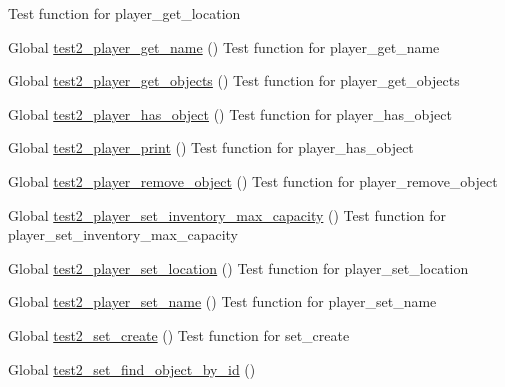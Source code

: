 \begin{DoxyRefList}
%
Test function for player\+\_\+get\+\_\+location  
\item[Global \mbox{\hyperlink{player__test_8c_a3aa908fd360b74e7786422260e8e16a0}{test2\+\_\+player\+\_\+get\+\_\+name}} ()]\label{test__test000132}%
%
Test function for player\+\_\+get\+\_\+name  
\item[Global \mbox{\hyperlink{player__test_8c_a08d3ba426b306cc9e9e766deef6e038d}{test2\+\_\+player\+\_\+get\+\_\+objects}} ()]\label{test__test000137}%
%
Test function for player\+\_\+get\+\_\+objects  
\item[Global \mbox{\hyperlink{player__test_8c_ae8953d45d8f555a930dbc8aba101d399}{test2\+\_\+player\+\_\+has\+\_\+object}} ()]\label{test__test000150}%
%
Test function for player\+\_\+has\+\_\+object  
\item[Global \mbox{\hyperlink{player__test_8c_a46b5c792a37831e8c142d4c32b9767f7}{test2\+\_\+player\+\_\+print}} ()]\label{test__test000158}%
%
Test function for player\+\_\+has\+\_\+object  
\item[Global \mbox{\hyperlink{player__test_8c_af9e74e12ad6961761f1ff61afa56be3e}{test2\+\_\+player\+\_\+remove\+\_\+object}} ()]\label{test__test000142}%
%
Test function for player\+\_\+remove\+\_\+object  
\item[Global \mbox{\hyperlink{player__test_8c_a25f52636fb912ac120d40e17f70554fb}{test2\+\_\+player\+\_\+set\+\_\+inventory\+\_\+max\+\_\+capacity}} ()]\label{test__test000155}%
%
Test function for player\+\_\+set\+\_\+inventory\+\_\+max\+\_\+capacity  
\item[Global \mbox{\hyperlink{player__test_8c_a2c702753d9e2e3df9ef4abf2d1b9bc8d}{test2\+\_\+player\+\_\+set\+\_\+location}} ()]\label{test__test000145}%
%
Test function for player\+\_\+set\+\_\+location  
\item[Global \mbox{\hyperlink{player__test_8c_a6e7ce8ff791f4bf63749df647a44263f}{test2\+\_\+player\+\_\+set\+\_\+name}} ()]\label{test__test000129}%
%
Test function for player\+\_\+set\+\_\+name  
\item[Global \mbox{\hyperlink{set__test_8c_abed3d273788e23fc31ae7f5ed59277b9}{test2\+\_\+set\+\_\+create}} ()]\label{test__test000161}%
%
Test function for set\+\_\+create  
\item[Global \mbox{\hyperlink{set__test_8c_a5ab7b30d4a8ea609094642ab4b8608ee}{test2\+\_\+set\+\_\+find\+\_\+object\+\_\+by\+\_\+id}} ()]\label{test__test000180}%

\end{DoxyRefList}
